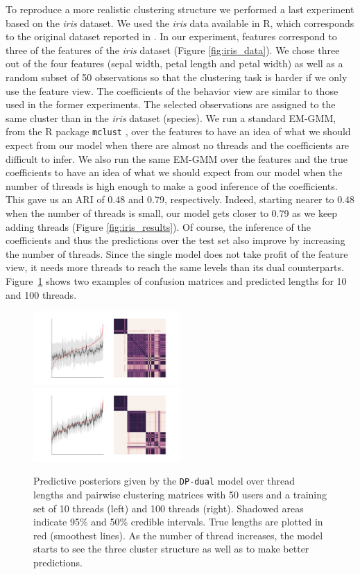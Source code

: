 \documentclass[smallextended]{svjour3}          %
\begin{document}
To reproduce a more realistic clustering structure we performed a last experiment based on the \textit{iris} dataset. We used the \textit{iris} data available in R, which corresponds to the original dataset reported in \cite{IrisData1935}. In our experiment, features correspond to three of the features of the \textit{iris} dataset (Figure \ref{fig:iris_data}). We chose three out of the four features (sepal width, petal length and petal width) as well as a random subset of 50 observations so that the clustering task is harder if we only use the feature view. The coefficients of the behavior view are similar to those used in the former experiments. The selected observations are assigned to the same cluster than in the \textit{iris} dataset (species). We run a standard EM-GMM, from the R package \texttt{mclust} \citep{mclust}, over the features to have an idea of what we should expect from our model when there are almost no threads and the coefficients are difficult to infer. We also run the same EM-GMM over the features and the true coefficients to have an idea of what we should expect from our model when the number of threads is high enough to make a good inference of the coefficients. This gave us an ARI of 0.48 and 0.79, respectively. Indeed, starting nearer to 0.48 when the number of threads is small, our model gets closer to 0.79 as we keep adding threads (Figure \ref{fig:iris_results}). Of course, the inference of the coefficients and thus the predictions over the test set also improve by increasing the number of threads. Since the single model does not take profit of the feature view, it needs more threads to reach the same levels than its dual counterparts. Figure~\ref{fig:iris_posteriors} shows two examples of confusion matrices and predicted lengths for 10 and 100 threads.
\begin{figure}
	\centering
	\includegraphics[width=0.5\textwidth]{Fig9_iris_posterior_10}%
	\includegraphics[width=0.5\textwidth]{Fig9_iris_posterior_100}
	\caption{Predictive posteriors given by the \texttt{DP-dual} model over thread lengths and pairwise clustering matrices with 50 users and a training set of 10 threads (left) and 100 threads (right). Shadowed areas indicate 95\% and 50\% credible intervals. True lengths are plotted in red (smoothest lines). As the number of thread increases, the model starts to see the three cluster structure as well as to make better predictions.}
	\label{fig:iris_posteriors}
\end{figure}
\end{document}
